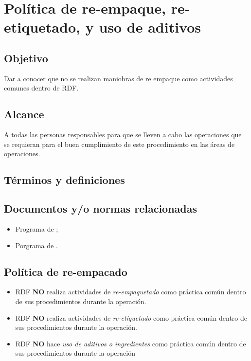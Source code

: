 \thispagestyle{formato-PI}
\renewcommand{\MayorVer}{2}
\renewcommand{\MenorVer}{0}
\renewcommand{\Codigo}{PSA-1-PROG} %
\renewcommand{\FechaPub}{2023--01}
\renewcommand{\Titulo}{Política de re-empaque, re-etiquetado, y uso de aditivos}

\section{\Titulo}

\subsection{Objetivo}
Dar a conocer que no se realizan maniobras de re empaque como actividades comunes dentro de \gls{RDF}.

\subsection{Alcance}
A todas las personas responsables para que se lleven a cabo las operaciones que se requieran para el buen cumplimiento de este procedimiento en las áreas de operaciones.

\subsection{Términos y definiciones}
\begin{description}
\end{description}

\subsection{Documentos y/o normas relacionadas}
\begin{itemize}
	\item Programa de ;
	\item Porgrama de .
\end{itemize}

\subsection{Política de re-empacado}
\begin{itemize}\label{pol:reempaquetado}
	\item \gls{RDF} \textbf{NO} realiza actividades de \emph{re-empaquetado} como práctica común dentro de sus procedimientos durante la operación.
	\item \gls{RDF} \textbf{NO} realiza actividades de \emph{re-etiquetado} como práctica común dentro de sus procedimientos durante la operación.
	\item \gls{RDF} \textbf{NO} hace \emph{uso de aditivos o ingredientes} como práctica común dentro de sus procedimientos durante la operación
\end{itemize}

